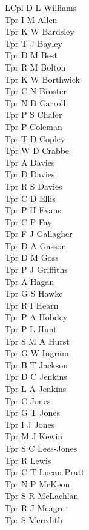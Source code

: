 \begin{multicols}{3}
  LCpl D L Williams \\
  Tpr I M Allen \\
  Tpr K W Bardsley \\
  Tpr T J Bayley \\
  Tpr D M Best \\
  Tpr R M Bolton \\
  Tpr K W Borthwick \\
  Tpr C N Broster \\
  Tpr N D Carroll \\
  Tpr P S Chafer \\
  Tpr P Coleman \\
  Tpr T D Copley \\
  Tpr W D Crabbe \\
  Tpr A Davies \\
  Tpr D Davies \\
  Tpr R S Davies \\
  Tpr C D Ellis \\
  Tpr P H Evans \\
  Tpr C P Fay \\
  Tpr F J Gallagher \\
  Tpr D A Gasson \\
  Tpr D M Goss \\
  Tpr P J Griffiths \\
  Tpr A Hagan \\
  Tpr G S Hawke \\
  Tpr R I Hearn \\
  Tpr P A Hobdey \\
  Tpr P L Hunt \\
  Tpr S M A Hurst \\
  Tpr G W Ingram \\
  Tpr B T Jackson \\
  Tpr D C Jenkins \\
  Tpr L A Jenkins \\
  Tpr C Jones \\
  Tpr G T Jones \\
  Tpr I J Jones \\
  Tpr M J Kewin \\
  Tpr S C Lees-Jones \\
  Tpr R Lewis \\
  Tpr C T Lucan-Pratt \\
  Tpr N P McKeon \\
  Tpr S R McLachlan \\
  Tpr R J Meagre \\
  Tpr S Meredith \\

\end{multicols}
